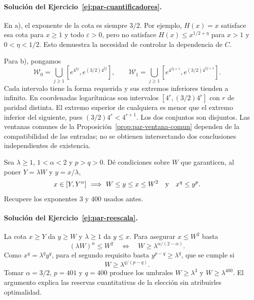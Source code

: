\paragraph{Solución del Ejercicio~\ref{ej:par-cuantificadores}.}
En a), el exponente de la cota es siempre $3/2$.
Por ejemplo, $H(x)=x$ satisface esa cota para $x\ge1$ y
todo $\varepsilon>0$, pero no satisface
$H(x)\le x^{1/2+\eta}$ para $x>1$ y $0<\eta<1/2$.
Esto demuestra la necesidad de controlar la dependencia de $C$.

Para b), pongamos
\[
 \mathcal W_0=\bigcup_{j\ge1}
      [e^{4^{2j}},e^{(3/2)4^{2j}}],
 \qquad
 \mathcal W_1=\bigcup_{j\ge1}
      [e^{4^{2j+1}},e^{(3/2)4^{2j+1}}].
\]
Cada intervalo tiene la forma requerida y sus extremos inferiores
tienden a infinito. En coordenadas logarítmicas son intervalos
$[4^r,(3/2)4^r]$ con $r$ de paridad distinta. El extremo
superior de cualquiera es menor que el extremo inferior del
siguiente, pues $(3/2)4^r<4^{r+1}$.
Los dos conjuntos son disjuntos. Las ventanas comunes de la
Proposición~\ref{prop:par-ventana-comun} dependen de la compatibilidad
de las entradas; no se obtienen intersectando dos conclusiones
independientes de existencia.

\begin{ejercicio}\label{ej:par-reescala}
Sea $\lambda\ge1$, $1<\alpha<2$ y $p>q>0$.
Dé condiciones sobre $W$ que garanticen, al poner
$Y=\lambda W$ y $y=x/\lambda$,
\[
 x\in[Y,Y^\alpha]\ \Longrightarrow\
 W\le y\le x\le W^2
 \quad\hbox{y}\quad x^q\le y^p.
\]
Recupere los exponentes $3$ y $400$ usados antes.
\end{ejercicio}

\paragraph{Solución del Ejercicio~\ref{ej:par-reescala}.}
La cota $x\ge Y$ da $y\ge W$ y $\lambda\ge1$ da $y\le x$.
Para asegurar $x\le W^2$ basta
\[
 (\lambda W)^\alpha\le W^2
 \quad\Longleftrightarrow\quad
 W\ge\lambda^{\alpha/(2-\alpha)}.
\]
Como $x^q=\lambda^q y^q$, para el segundo requisito basta
$y^{p-q}\ge\lambda^q$, que se cumple si
\[
 W\ge\lambda^{q/(p-q)}.
\]
Tomar $\alpha=3/2$, $p=401$ y $q=400$ produce los umbrales
$W\ge\lambda^3$ y $W\ge\lambda^{400}$. El argumento explica
las reservas cuantitativas de la elección sin atribuirles optimalidad.
